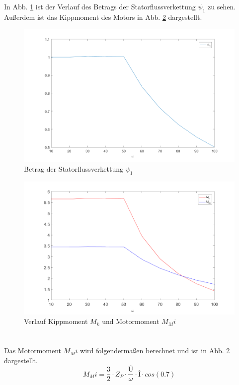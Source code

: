 \section{}\label{sec:aufg6b}
%
In Abb. \ref{fig:Statorflussverkettung} ist der Verlauf des Betrags der Statorflussverkettung $\psi_1$ zu sehen. Außerdem ist das Kippmoment des Motors in Abb. \ref{fig:momente} dargestellt.
\begin{figure}[htb]
	\includegraphics[width = \textwidth]{./Bilder/f_psi}
	\caption{Betrag der Statorflussverkettung $\psi_1$}
	\label{fig:Statorflussverkettung}
\end{figure}
%
\begin{figure}[htb]
	\includegraphics[width = \textwidth]{./Bilder/f_moment}
	\caption{Verlauf Kippmoment $M_k$ und Motormoment $M_Mi$}
	\label{fig:momente}
\end{figure}
\newpage
\section{}\label{sec:aufg6c}
%
Das Motormoment $M_Mi$ wird folgendermaßen berechnet und ist in Abb. \ref{fig:momente} dargestellt.
\begin{equation}
M_Mi = \frac{3}{2}\cdot Z_P \cdot \frac{\textit{\^{U}}}{\omega} \cdot \textit{\^{I}} \cdot cos(0.7)
\end{equation}